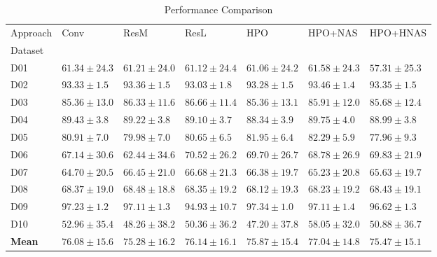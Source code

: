 \begin{table}
\caption{Performance Comparison}
\label{tab:results}
\begin{tabular}{lllllll}
\toprule
Approach & Conv & ResM & ResL & HPO & HPO+NAS & HPO+HNAS \\
Dataset &  &  &  &  &  &  \\
\midrule
D01 & $61.34 \pm 24.3$ & $61.21 \pm 24.0$ & $61.12 \pm 24.4$ & $61.06 \pm 24.2$ & $\mathbf{61.58 \pm 24.3}$ & $57.31 \pm 25.3$ \\
D02 & $93.33 \pm 1.5$ & $93.36 \pm 1.5$ & $93.03 \pm 1.8$ & $93.28 \pm 1.5$ & $\mathbf{93.46 \pm 1.4}$ & $93.35 \pm 1.5$ \\
D03 & $85.36 \pm 13.0$ & $86.33 \pm 11.6$ & $\mathbf{86.66 \pm 11.4}$ & $85.36 \pm 13.1$ & $85.91 \pm 12.0$ & $85.68 \pm 12.4$ \\
D04 & $89.43 \pm 3.8$ & $89.22 \pm 3.8$ & $89.10 \pm 3.7$ & $88.34 \pm 3.9$ & $\mathbf{89.75 \pm 4.0}$ & $88.99 \pm 3.8$ \\
D05 & $80.91 \pm 7.0$ & $79.98 \pm 7.0$ & $80.65 \pm 6.5$ & $81.95 \pm 6.4$ & $\mathbf{82.29 \pm 5.9}$ & $77.96 \pm 9.3$ \\
D06 & $67.14 \pm 30.6$ & $62.44 \pm 34.6$ & $\mathbf{70.52 \pm 26.2}$ & $69.70 \pm 26.7$ & $68.78 \pm 26.9$ & $69.83 \pm 21.9$ \\
D07 & $64.70 \pm 20.5$ & $66.45 \pm 21.0$ & $\mathbf{66.68 \pm 21.3}$ & $66.38 \pm 19.7$ & $65.23 \pm 20.8$ & $65.63 \pm 19.7$ \\
D08 & $68.37 \pm 19.0$ & $\mathbf{68.48 \pm 18.8}$ & $68.35 \pm 19.2$ & $68.12 \pm 19.3$ & $68.23 \pm 19.2$ & $68.43 \pm 19.1$ \\
D09 & $97.23 \pm 1.2$ & $97.11 \pm 1.3$ & $94.93 \pm 10.7$ & $\mathbf{97.34 \pm 1.0}$ & $97.11 \pm 1.4$ & $96.62 \pm 1.3$ \\
D10 & $52.96 \pm 35.4$ & $48.26 \pm 38.2$ & $50.36 \pm 36.2$ & $47.20 \pm 37.8$ & $\mathbf{58.05 \pm 32.0}$ & $50.88 \pm 36.7$ \\
\textbf{Mean} & $76.08 \pm 15.6$ & $75.28 \pm 16.2$ & $76.14 \pm 16.1$ & $75.87 \pm 15.4$ & $\mathbf{77.04 \pm 14.8}$ & $75.47 \pm 15.1$ \\
\bottomrule
\end{tabular}
\end{table}
